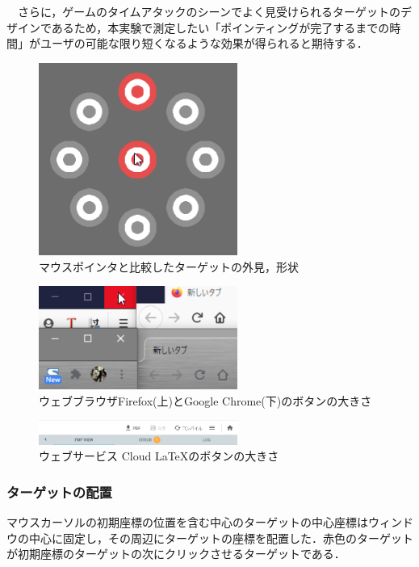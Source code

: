 \documentclass[a4paper, papersize, titlepage]{jsarticle}
\begin{document}
\begin{multicols}{2}
　さらに，ゲームのタイムアタックのシーンでよく見受けられるターゲットのデザインであるため，本実験で測定したい「ポインティングが完了するまでの時間」がユーザの可能な限り短くなるような効果が得られると期待する．

\begin{figure}[H]
 \centering
   \includegraphics[width=65mm]{target_looks.png}
 \caption{マウスポインタと比較したターゲットの外見，形状}
 \label{target_looks}
\end{figure}
\noindent


\begin{figure}[H]
 \centering
   \includegraphics[width=65mm]{browser_button.png}
 \caption{ウェブブラウザFirefox(上)とGoogle Chrome(下)のボタンの大きさ}
 \label{browser_button}
\end{figure}
\noindent


\begin{figure}[H]
 \centering
   \includegraphics[width=65mm]{latex_button.png}
 \caption{ウェブサービス Cloud LaTeXのボタンの大きさ}
 \label{latex_button}
\end{figure}
\noindent


\subsubsection{ターゲットの配置}
マウスカーソルの初期座標の位置を含む中心のターゲットの中心座標はウィンドウの中心に固定し，その周辺にターゲットの座標を配置した．赤色のターゲットが初期座標のターゲットの次にクリックさせるターゲットである．


\end{multicols}
\end{document}
